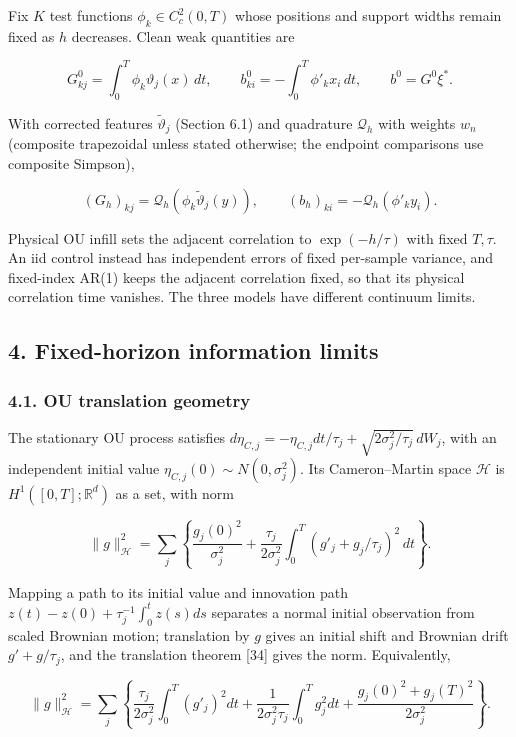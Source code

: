 \documentclass[
  american,
  11pt,
]{article}
\begin{document}
Fix \(K\) test functions \(\phi_k\in C_c^2(0,T)\) whose positions and
support widths remain fixed as \(h\) decreases. Clean weak quantities
are

\[
G^0_{kj}=\int_0^T\phi_k\vartheta_j(x)\,dt,\qquad
b^0_{ki}=-\int_0^T\phi'_kx_i\,dt,\qquad b^0=G^0\xi^*.
\]

With corrected features \(\widetilde\vartheta_j\) (Section 6.1) and
quadrature \(\mathcal Q_h\) with weights \(w_n\) (composite trapezoidal
unless stated otherwise; the endpoint comparisons use composite
Simpson),

\[
(G_h)_{kj}=\mathcal Q_h(\phi_k\widetilde\vartheta_j(y)),\qquad
(b_h)_{ki}=-\mathcal Q_h(\phi'_ky_i).
\]

Physical OU infill sets the adjacent correlation to \(\exp(-h/\tau)\)
with fixed \(T,\tau\). An iid control instead has independent errors of
fixed per-sample variance, and fixed-index AR(1) keeps the adjacent
correlation fixed, so that its physical correlation time vanishes. The
three models have different continuum limits.

\subsection{4. Fixed-horizon information
limits}\label{fixed-horizon-information-limits}

\subsubsection{4.1. OU translation
geometry}\label{ou-translation-geometry}

The stationary OU process satisfies
\(d\eta_{C,j}=-\eta_{C,j}dt/\tau_j+\sqrt{2\sigma_j^2/\tau_j}\,dW_j\),
with an independent initial value \(\eta_{C,j}(0)\sim N(0,\sigma_j^2)\).
Its Cameron--Martin space \(\mathcal H\) is \(H^1([0,T];\mathbb R^d)\)
as a set, with norm

\[
\|g\|_{\mathcal H}^2=\sum_j\left\{\frac{g_j(0)^2}{\sigma_j^2}+
\frac{\tau_j}{2\sigma_j^2}\int_0^T(g'_j+g_j/\tau_j)^2\,dt\right\}.
\]

Mapping a path to its initial value and innovation path
\(z(t)-z(0)+\tau_j^{-1}\int_0^tz(s)ds\) separates a normal initial
observation from scaled Brownian motion; translation by \(g\) gives an
initial shift and Brownian drift \(g'+g/\tau_j\), and the translation
theorem {[}34{]} gives the norm. Equivalently,

\[
\|g\|_{\mathcal H}^2=\sum_j\left\{\frac{\tau_j}{2\sigma_j^2}\int_0^T(g'_j)^2dt+
\frac1{2\sigma_j^2\tau_j}\int_0^Tg_j^2dt+
\frac{g_j(0)^2+g_j(T)^2}{2\sigma_j^2}\right\}.
\]
\end{document}
